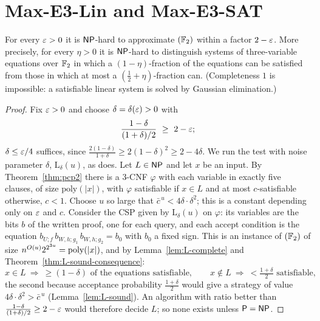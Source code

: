 \section{Max-E3-Lin and Max-E3-SAT}
\label{sec:e3sat}

\begin{theorem}\label{thm:e3lin}
For every $\varepsilon>0$ it is $\mathsf{NP}$-hard to approximate $(\mathbb{F}_2)$ within a factor $2-\varepsilon$.  More precisely, for every $\eta>0$ it is $\mathsf{NP}$-hard to distinguish systems of three-variable equations over $\mathbb{F}_2$ in which a $(1-\eta)$-fraction of the equations can be satisfied from those in which at most a $(\tfrac12+\eta)$-fraction can.  (Completeness $1$ is impossible: a satisfiable linear system is solved by Gaussian elimination.)
\end{theorem}
\begin{proof}
Fix $\varepsilon>0$ and choose $\delta=\delta(\varepsilon)>0$ with
\begin{equation}\label{eq:choose-delta}
  \frac{1-\delta}{(1+\delta)/2}\ \ge\ 2-\varepsilon ;
\end{equation}
$\delta\le\varepsilon/4$ suffices, since $\frac{2(1-\delta)}{1+\delta}\ge2(1-\delta)^2\ge2-4\delta$.  We run the test with noise parameter $\delta$, \ie $\mathrm{L}_\delta(u)$, as \cite{Hastad01} does.
Let $L\in\mathsf{NP}$ and let $x$ be an input.  By Theorem~\ref{thm:pcp2} there is a $3$-CNF $\varphi$ with each variable in exactly five clauses, of size $\mathrm{poly}(|x|)$, with $\varphi$ satisfiable if $x\in L$ and at most $c$-satisfiable otherwise, $c<1$.
Choose $u$ so large that $\bar c^{\,u}<4\delta\cdot\delta^2$; this is a constant depending only on $\varepsilon$ and $c$.
Consider the CSP given by $\mathrm{L}_\delta(u)$ on $\varphi$: its variables are the bits $b$ of the written proof, one for each query, and each accept condition is the equation $b_{U;f}\,b_{W,h;g_1}\,b_{W,h;g_2}=b_0$ with $b_0$ a fixed sign.
This is an instance of $(\mathbb{F}_2)$ of size $n^{O(u)}2^{2^{3u}}=\operatorname{poly}(|x|)$, and by Lemma~\ref{lem:L-complete} and Theorem~\ref{thm:L-sound-consequence}:
\[
  x\in L\ \Rightarrow\ \ge(1-\delta)\text{ of the equations satisfiable},\qquad
  x\notin L\ \Rightarrow\ <\tfrac{1+\delta}{2}\text{ satisfiable,}
\]
the second because acceptance probability $\tfrac{1+\delta}{2}$ would give a strategy of value $4\delta\cdot\delta^2>\bar c^{\,u}$ (Lemma~\ref{lem:L-sound}).
An algorithm with ratio better than $\frac{1-\delta}{(1+\delta)/2}\ge 2-\varepsilon$ would therefore decide $L$; so none exists unless $\mathsf{P}=\mathsf{NP}$.
\end{proof}

